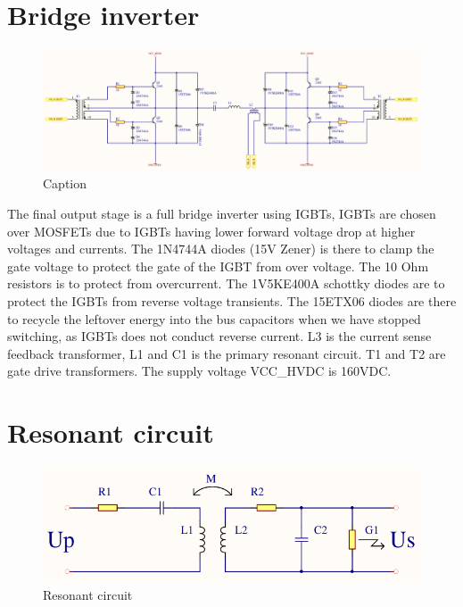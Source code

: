 \newpage
\section{Bridge inverter}

\begin{figure}[h!]
    \centering
    \includegraphics[width=\textwidth]{Skjema/TK531_Utgangstrinn.pdf}
    \caption{Caption}
    \label{fig:tk531}
\end{figure}

The final output stage is a full bridge inverter using IGBTs, IGBTs are chosen over MOSFETs due to IGBTs having lower forward voltage drop at higher voltages and currents. The 1N4744A diodes (15V Zener) is there to clamp the gate voltage to protect the gate of the IGBT from over voltage. The 10 Ohm resistors is to protect from overcurrent. The 1V5KE400A schottky diodes are to protect the IGBTs from reverse voltage transients. The 15ETX06 diodes are there to recycle the leftover energy into the bus capacitors when we have stopped switching, as IGBTs does not conduct reverse current. L3 is the current sense feedback transformer, L1 and C1 is the primary resonant circuit. T1 and T2 are gate drive transformers. The supply voltage VCC\_HVDC is 160VDC.


\newpage
\section{Resonant circuit}

\begin{figure}[h!]
    \centering
    \includegraphics[width=\textwidth]{Skjema/Spolerigg1.pdf}
    \caption{Resonant circuit}
    \label{fig:spolerigg1}
\end{figure}

